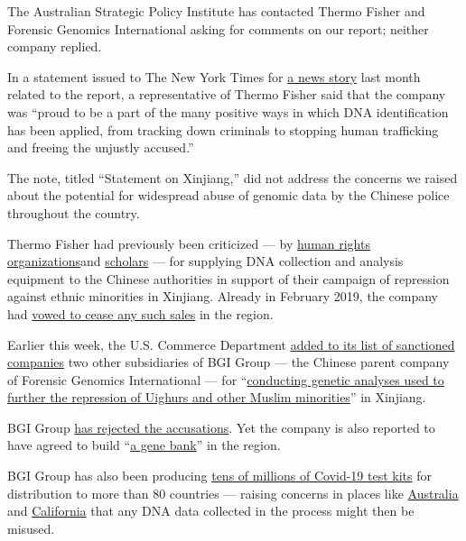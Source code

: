 The Australian Strategic Policy Institute has contacted Thermo Fisher
and Forensic Genomics International asking for comments on our report;
neither company replied.

In a statement issued to The New York Times for
\href{https://www.nytimes3xbfgragh.onion/2020/06/17/world/asia/China-DNA-surveillance.html}{a
news story} last month related to the report, a representative of Thermo
Fisher said that the company was ``proud to be a part of the many
positive ways in which DNA identification has been applied, from
tracking down criminals to stopping human trafficking and freeing the
unjustly accused.''

The note, titled ``Statement on Xinjiang,'' did not address the concerns
we raised about the potential for widespread abuse of genomic data by
the Chinese police throughout the country.

Thermo Fisher had previously been criticized --- by
\href{https://www.hrw.org/news/2017/12/13/china-minority-region-collects-dna-millions}{human
rights organizations}and
\href{https://www.nature.com/articles/d41586-019-03687-x}{scholars} ---
for supplying DNA collection and analysis equipment to the Chinese
authorities in support of their campaign of repression against ethnic
minorities in Xinjiang. Already in February 2019, the company had
\href{https://www.thermofisher.com/hk/en/home.html}{vowed to cease any
such sales} in the region.

Earlier this week, the U.S. Commerce Department
\href{https://www.nytimes3xbfgragh.onion/2020/07/21/business/china-us-trade-banned.html}{added
to its list of sanctioned companies} two other subsidiaries of BGI Group
--- the Chinese parent company of Forensic Genomics International ---
for
``\href{https://www.commerce.gov/news/press-releases/2020/07/commerce-department-adds-eleven-chinese-entities-implicated-human}{conducting
genetic analyses used to further the repression of Uighurs and other
Muslim minorities}'' in Xinjiang.

BGI Group
\href{https://www.nytimes3xbfgragh.onion/2020/07/21/business/china-us-trade-banned.html}{has
rejected the accusations}. Yet the company is also reported to have
agreed to build
``\href{https://www.axios.com/chinese-coronavirus-test-maker-agreed-to-build-a-xinjiang-gene-bank-f82b6918-d6c5-45f9-90b8-dad3341d6a6e.html}{a
gene bank}'' in the region.

BGI Group has also been producing
\href{https://www.prnewswire.com/news-releases/bgi-group-helping-over-80-countries-for-timely-covid-19-detection-and-intervention-301043895.html}{tens
of millions of Covid-19 test kits} for distribution to more than 80
countries --- raising concerns in places like
\href{https://www.theguardian.com/australia-news/2020/jul/09/australian-experts-raise-security-concerns-about-chinese-maker-of-andrew-forrest-covid-19-tests}{Australia}
and
\href{https://www.washingtonpost.com/business/2020/07/02/china-bgi-california-testing/}{California}
that any DNA data collected in the process might then be misused.

